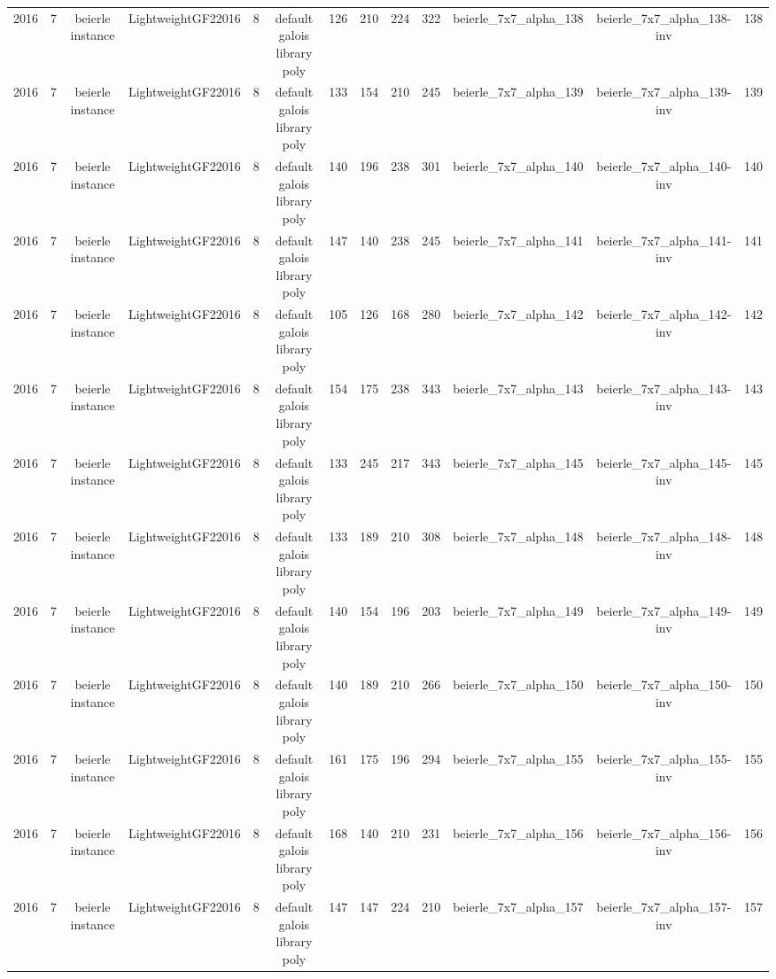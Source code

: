 \begin{tabular}{c c c c c c c c c c c c c}
2016 & 7 & beierle instance & LightweightGF22016 & 8 & default galois library poly & 126 & 210 & 224 & 322 & beierle_7x7_alpha_138 & beierle_7x7_alpha_138-inv & 138 \\
2016 & 7 & beierle instance & LightweightGF22016 & 8 & default galois library poly & 133 & 154 & 210 & 245 & beierle_7x7_alpha_139 & beierle_7x7_alpha_139-inv & 139 \\
2016 & 7 & beierle instance & LightweightGF22016 & 8 & default galois library poly & 140 & 196 & 238 & 301 & beierle_7x7_alpha_140 & beierle_7x7_alpha_140-inv & 140 \\
2016 & 7 & beierle instance & LightweightGF22016 & 8 & default galois library poly & 147 & 140 & 238 & 245 & beierle_7x7_alpha_141 & beierle_7x7_alpha_141-inv & 141 \\
2016 & 7 & beierle instance & LightweightGF22016 & 8 & default galois library poly & 105 & 126 & 168 & 280 & beierle_7x7_alpha_142 & beierle_7x7_alpha_142-inv & 142 \\
2016 & 7 & beierle instance & LightweightGF22016 & 8 & default galois library poly & 154 & 175 & 238 & 343 & beierle_7x7_alpha_143 & beierle_7x7_alpha_143-inv & 143 \\
2016 & 7 & beierle instance & LightweightGF22016 & 8 & default galois library poly & 133 & 245 & 217 & 343 & beierle_7x7_alpha_145 & beierle_7x7_alpha_145-inv & 145 \\
2016 & 7 & beierle instance & LightweightGF22016 & 8 & default galois library poly & 133 & 189 & 210 & 308 & beierle_7x7_alpha_148 & beierle_7x7_alpha_148-inv & 148 \\
2016 & 7 & beierle instance & LightweightGF22016 & 8 & default galois library poly & 140 & 154 & 196 & 203 & beierle_7x7_alpha_149 & beierle_7x7_alpha_149-inv & 149 \\
2016 & 7 & beierle instance & LightweightGF22016 & 8 & default galois library poly & 140 & 189 & 210 & 266 & beierle_7x7_alpha_150 & beierle_7x7_alpha_150-inv & 150 \\
2016 & 7 & beierle instance & LightweightGF22016 & 8 & default galois library poly & 161 & 175 & 196 & 294 & beierle_7x7_alpha_155 & beierle_7x7_alpha_155-inv & 155 \\
2016 & 7 & beierle instance & LightweightGF22016 & 8 & default galois library poly & 168 & 140 & 210 & 231 & beierle_7x7_alpha_156 & beierle_7x7_alpha_156-inv & 156 \\
2016 & 7 & beierle instance & LightweightGF22016 & 8 & default galois library poly & 147 & 147 & 224 & 210 & beierle_7x7_alpha_157 & beierle_7x7_alpha_157-inv & 157 \\

\end{tabular}
